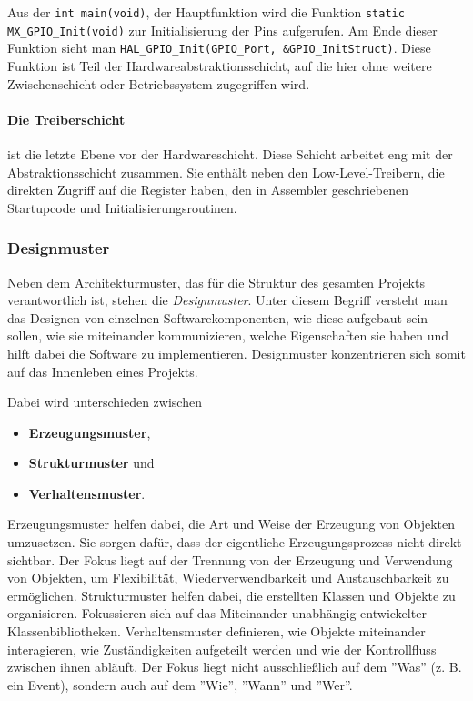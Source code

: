 Aus der \texttt{int main(void)}, der Hauptfunktion wird die Funktion \texttt{static MX\_GPIO\_Init(void)} zur Initialisierung der Pins aufgerufen.
Am Ende dieser Funktion sieht man \texttt{HAL\_GPIO\_Init(GPIO\_Port, \&GPIO\_InitStruct)}.
Diese Funktion ist Teil der Hardwareabstraktionsschicht, auf die hier ohne weitere Zwischenschicht oder Betriebssystem zugegriffen wird.

\paragraph{Die Treiberschicht} 
ist die letzte Ebene vor der Hardwareschicht.
Diese Schicht arbeitet eng mit der Abstraktionsschicht zusammen.
Sie enthält neben den Low-Level-Treibern, die direkten Zugriff auf die Register haben, den in Assembler geschriebenen Startupcode und Initialisierungsroutinen.


\subsubsection{Designmuster}
Neben dem Architekturmuster, das für die Struktur des gesamten Projekts verantwortlich ist, stehen die \emph{Designmuster}.
Unter diesem Begriff versteht man das Designen von einzelnen Softwarekomponenten, wie diese aufgebaut sein sollen, wie sie miteinander kommunizieren, welche Eigenschaften sie haben und hilft dabei die Software zu implementieren.
Designmuster konzentrieren sich somit auf das Innenleben eines Projekts.\cite{gfg_DesignVsArchitecture}

Dabei wird unterschieden zwischen
\begin{itemize}
	\item \textbf{Erzeugungsmuster},
	\item \textbf{Strukturmuster} und
	\item \textbf{Verhaltensmuster}.
\end{itemize}

Erzeugungsmuster helfen dabei, die Art und Weise der Erzeugung von Objekten umzusetzen.
Sie sorgen dafür, dass der eigentliche Erzeugungsprozess nicht direkt sichtbar.
Der Fokus liegt auf der Trennung von der Erzeugung und Verwendung von Objekten, um Flexibilität, Wiederverwendbarkeit und Austauschbarkeit zu ermöglichen.
Strukturmuster helfen dabei, die erstellten Klassen und Objekte zu organisieren.
Fokussieren sich auf das Miteinander unabhängig entwickelter Klassenbibliotheken.
Verhaltensmuster definieren, wie Objekte miteinander interagieren, wie Zuständigkeiten aufgeteilt werden und wie der Kontrollfluss zwischen ihnen abläuft.
Der Fokus liegt nicht ausschließlich auf dem ''Was'' (z. B. ein Event), sondern auch auf dem ''Wie'', ''Wann'' und ''Wer''.


